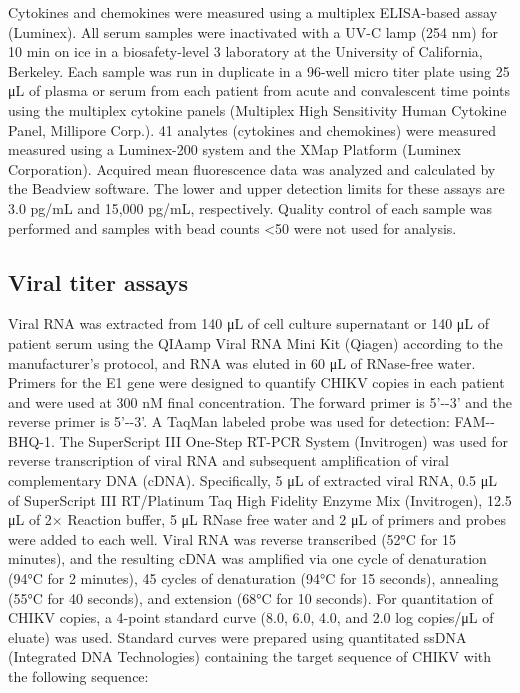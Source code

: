 Cytokines and chemokines were measured using a multiplex ELISA-based assay (Luminex). All serum samples were inactivated with a UV-C lamp (254 nm) for 10 min on ice in a biosafety-level 3 laboratory at the University of California, Berkeley. Each sample was run in duplicate in a 96-well micro titer plate using 25 μL of plasma or serum from each patient from acute and convalescent time points using the multiplex cytokine panels (Multiplex High Sensitivity Human Cytokine Panel, Millipore Corp.). 41 analytes (cytokines and chemokines) were measured measured using a Luminex-200 system and the XMap Platform (Luminex Corporation). Acquired mean fluorescence data was analyzed and calculated by the Beadview software. The lower and upper detection limits for these assays are 3.0 pg/mL and 15,000 pg/mL, respectively. Quality control of each sample was performed and samples with bead counts <50 were not used for analysis.  

\subsection{Viral titer assays}

Viral RNA was extracted from 140 μL of cell culture supernatant or 140 μL of patient serum using the QIAamp Viral RNA Mini Kit (Qiagen) according to the manufacturer’s protocol, and RNA was eluted in 60 μL of RNase-free water. Primers for the E1 gene were designed to quantify CHIKV copies in each patient and were used at 300 nM final concentration. The forward primer is 5'-\texttt{}-3' and the reverse primer is 5'-\texttt{}-3'.  A TaqMan labeled probe was used for detection: FAM-\texttt{}-BHQ-1. The SuperScript III One-Step RT-PCR System (Invitrogen) was used for reverse transcription of viral RNA and subsequent amplification of viral complementary DNA (cDNA). Specifically, 5 μL of extracted viral RNA, 0.5 μL of SuperScript III RT/Platinum Taq High Fidelity Enzyme Mix (Invitrogen), 12.5 μL of 2× Reaction buffer, 5 μL RNase free water and 2 μL of primers and probes were added to each well. Viral RNA was reverse transcribed (52°C for 15 minutes), and the resulting cDNA was amplified via one cycle of denaturation (94°C for 2 minutes), 45 cycles of denaturation (94°C for 15 seconds), annealing (55°C for 40 seconds), and extension (68°C for 10 seconds). For quantitation of CHIKV copies, a 4-point standard curve (8.0, 6.0, 4.0, and 2.0 log copies/μL of eluate) was used. Standard curves were prepared using quantitated ssDNA (Integrated DNA Technologies) containing the target sequence of CHIKV with the following sequence: \texttt{}

